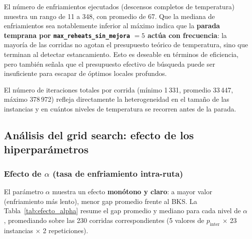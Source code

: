 El número de enfriamientos ejecutados (descensos completos de temperatura) muestra un
rango de 11 a 348, con promedio de 67. Que la mediana de enfriamientos sea notablemente
inferior al máximo indica que la \textbf{parada temprana por
\texttt{max\_reheats\_sin\_mejora} \(= 5\) actúa con frecuencia}: la mayoría de las
corridas no agotan el presupuesto teórico de temperatura, sino que terminan al detectar
estancamiento. Esto es deseable en términos de eficiencia, pero también señala que el
presupuesto efectivo de búsqueda puede ser insuficiente para escapar de óptimos locales
profundos.

El número de iteraciones totales por corrida (mínimo 1\,331, promedio 33\,447, máximo
378\,972) refleja directamente la heterogeneidad en el tamaño de las instancias y en
cuántos niveles de temperatura se recorren antes de la parada.

\subsection{Análisis del grid search: efecto de los hiperparámetros}
\label{subsec:analisis_grid}

\subsubsection{Efecto de \texorpdfstring{$\alpha$}{alpha} (tasa de enfriamiento intra-ruta)}
\label{subsubsec:efecto_alpha}

El parámetro \(\alpha\) muestra un efecto \textbf{monótono y claro}: a mayor valor
(enfriamiento más lento), menor gap promedio frente al BKS. La
Tabla~\ref{tab:efecto_alpha} resume el gap promedio y mediano para cada nivel de
\(\alpha\), promediando sobre las 230 corridas correspondientes (5 valores de
\(p_{\text{inter}}\) \(\times\) 23 instancias \(\times\) 2 repeticiones).

